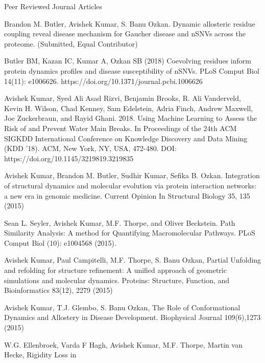 \begin{cventries}
\cventry
    {}
    {Peer Reviewed Journal Articles}
    {}
    {}
    {
\begin{cvitems}
    \vspace{-1\baselineskip}
    \setlength\itemsep{.5em}
    \item Brandon M. Butler, Avishek Kumar, S. Banu Ozkan. Dynamic allosteric residue coupling reveal disease mechanism for Gaucher disease and nSNVs across the proteome. (Submitted, Equal Contributor)
    \item Butler BM, Kazan IC, Kumar A, Ozkan SB (2018) Coevolving residues inform protein dynamics profiles and disease susceptibility of nSNVs. PLoS Comput Biol 14(11): e1006626. https://doi.org/10.1371/journal.pcbi.1006626
    \item Avishek Kumar, Syed Ali Asad Rizvi, Benjamin Brooks, R. Ali Vanderveld, Kevin H. Wilson, Chad
Kenney, Sam Edelstein, Adria Finch, Andrew Maxwell, Joe Zuckerbraun, and Rayid Ghani. 2018.
Using Machine Learning to Assess the Risk of and Prevent Water Main Breaks. In Proceedings of the
24th ACM SIGKDD International Conference on Knowledge Discovery and Data Mining (KDD '18).
ACM, New York, NY, USA, 472-480. DOI: https://doi.org/10.1145/3219819.3219835
    \item Avishek Kumar, Brandon M. Butler, Sudhir Kumar, Sefika B. Ozkan. Integration of structural
dynamics and molecular evolution via protein interaction networks: a new era in genomic medicine.
Current Opinion In Structural Biology 35, 135 (2015)
    \item Sean L. Seyler, Avishek Kumar, M.F. Thorpe, and Oliver Beckstein. Path Similarity Analysis: A
method for Quantifying Macromolecular Pathways. PLoS Comput Biol (10): e1004568 (2015).
    \item Avishek Kumar, Paul Campitelli, M.F. Thorpe, S. Banu Ozkan, Partial Unfolding and refolding for
structure refinement: A unified approach of geometric simulations and molecular dynamics. Proteins:
Structure, Function, and Bioinformatics 83(12), 2279 (2015)
    \item Avishek Kumar, T.J. Glembo, S. Banu Ozkan, The Role of Conformational Dynamics and Allostery in
Disease Development. Biophysical Journal 109(6),1273 (2015)
    \item W.G. Ellenbroek, Varda F Hagh, Avishek Kumar, M.F. Thorpe, Martin van Hecke, Rigidity Loss in

\end{cvitems}}
\end{cventries}
